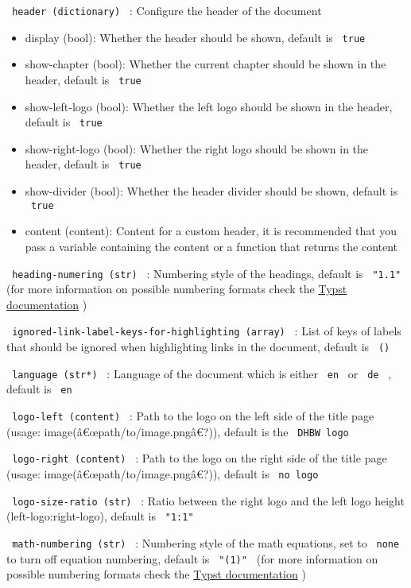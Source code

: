 \texttt{\ header\ (dictionary)\ } : Configure the header of the document

\begin{itemize}
\tightlist
\item
  display (bool): Whether the header should be shown, default is
  \texttt{\ true\ }
\item
  show-chapter (bool): Whether the current chapter should be shown in
  the header, default is \texttt{\ true\ }
\item
  show-left-logo (bool): Whether the left logo should be shown in the
  header, default is \texttt{\ true\ }
\item
  show-right-logo (bool): Whether the right logo should be shown in the
  header, default is \texttt{\ true\ }
\item
  show-divider (bool): Whether the header divider should be shown,
  default is \texttt{\ true\ }
\item
  content (content): Content for a custom header, it is recommended that
  you pass a variable containing the content or a function that returns
  the content
\end{itemize}

\texttt{\ heading-numering\ (str)\ } : Numbering style of the headings,
default is \texttt{\ "1.1"\ } (for more information on possible
numbering formats check the
\href{https://typst.app/docs/reference/model/numbering}{Typst
documentation} )

\texttt{\ ignored-link-label-keys-for-highlighting\ (array)\ } : List of
keys of labels that should be ignored when highlighting links in the
document, default is \texttt{\ ()\ }

\texttt{\ language\ (str*)\ } : Language of the document which is either
\texttt{\ en\ } or \texttt{\ de\ } , default is \texttt{\ en\ }

\texttt{\ logo-left\ (content)\ } : Path to the logo on the left side of
the title page (usage: image(â€œpath/to/image.pngâ€?)), default is the
\texttt{\ DHBW\ logo\ }

\texttt{\ logo-right\ (content)\ } : Path to the logo on the right side
of the title page (usage: image(â€œpath/to/image.pngâ€?)), default is
\texttt{\ no\ logo\ }

\texttt{\ logo-size-ratio\ (str)\ } : Ratio between the right logo and
the left logo height (left-logo:right-logo), default is
\texttt{\ "1:1"\ }

\texttt{\ math-numbering\ (str)\ } : Numbering style of the math
equations, set to \texttt{\ none\ } to turn off equation numbering,
default is \texttt{\ "(1)"\ } (for more information on possible
numbering formats check the
\href{https://typst.app/docs/reference/model/numbering}{Typst
documentation} )

